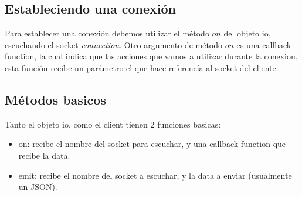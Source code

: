 \documentclass[11pt,a4paper]{book}
\begin{document}
    \subsection{Estableciendo una conexión}

    Para establecer una conexión debemos utilizar el método $on$ del objeto io, escuchando el socket \textit{connection}. 
    Otro argumento de método $on$ es una callback function, la cual indica que las acciones que vamos a utilizar 
    durante la conexion, esta función recibe un parámetro el que hace referencía al socket del cliente.

    \subsection{Métodos basicos} 

    Tanto el objeto io, como el client tienen 2 funciones basicas: 

    \begin{itemize}
        \item on: recibe el nombre del socket para escuchar, y una callback function que recibe la data.
        \item emit: recibe el nombre del socket a escuchar, y la data a enviar (usualmente un JSON).
    \end{itemize}

    
\end{document}
